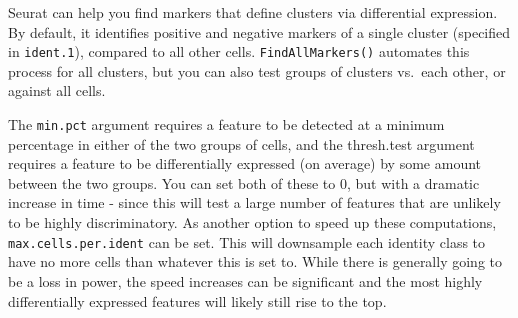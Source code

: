 \documentclass[
]{book}
\begin{document}
Seurat can help you find markers that define clusters via differential expression. By default, it identifies positive and negative markers of a single cluster (specified in \texttt{ident.1}), compared to all other cells. \texttt{FindAllMarkers()} automates this process for all clusters, but you can also test groups of clusters vs.~each other, or against all cells.

The \texttt{min.pct} argument requires a feature to be detected at a minimum percentage in either of the two groups of cells, and the thresh.test argument requires a feature to be differentially expressed (on average) by some amount between the two groups. You can set both of these to 0, but with a dramatic increase in time - since this will test a large number of features that are unlikely to be highly discriminatory. As another option to speed up these computations, \texttt{max.cells.per.ident} can be set. This will downsample each identity class to have no more cells than whatever this is set to. While there is generally going to be a loss in power, the speed increases can be significant and the most highly differentially expressed features will likely still rise to the top.
\end{document}
